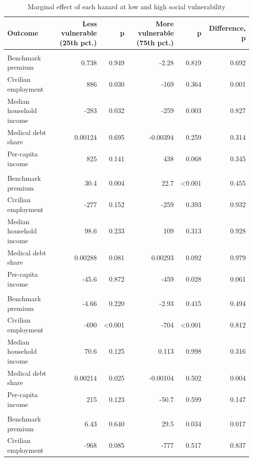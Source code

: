 \begin{table}[htbp]
\centering
\scriptsize
\setlength{\tabcolsep}{4pt}
\sloppy
\caption{Marginal effect of each hazard at low and high social vulnerability}
\label{tab:e3t2}
\begin{tabularx}{\textwidth}{>{\raggedright\arraybackslash}X r r r r r}
\toprule
Outcome & Less vulnerable (25th pct.) & p & More vulnerable (75th pct.) & p  & Difference, p \\
\midrule
\multicolumn{6}{l}{\textit{Extreme heat}} \\
Benchmark premium & 0.738 & 0.949 & -2.28 & 0.819 & 0.692 \\
Civilian employment & 886 & 0.030 & -169 & 0.364 & 0.001 \\
Median household income & -283 & 0.032 & -259 & 0.003 & 0.827 \\
Medical debt share & 0.00124 & 0.695 & -0.00394 & 0.259 & 0.314 \\
Per-capita income & 825 & 0.141 & 438 & 0.068 & 0.345 \\
\addlinespace
\multicolumn{6}{l}{\textit{Extreme cold}} \\
Benchmark premium & 30.4 & 0.004 & 22.7 & \textless{}0.001 & 0.455 \\
Civilian employment & -277 & 0.152 & -259 & 0.393 & 0.932 \\
Median household income & 98.6 & 0.233 & 109 & 0.313 & 0.928 \\
Medical debt share & 0.00288 & 0.081 & 0.00293 & 0.092 & 0.979 \\
Per-capita income & -45.6 & 0.872 & -459 & 0.028 & 0.061 \\
\addlinespace
\multicolumn{6}{l}{\textit{Cumulative cold-years}} \\
Benchmark premium & -4.66 & 0.220 & -2.93 & 0.415 & 0.494 \\
Civilian employment & -690 & \textless{}0.001 & -704 & \textless{}0.001 & 0.812 \\
Median household income & 70.6 & 0.125 & 0.113 & 0.998 & 0.316 \\
Medical debt share & 0.00214 & 0.025 & -0.00104 & 0.502 & 0.004 \\
Per-capita income & 215 & 0.123 & -50.7 & 0.599 & 0.147 \\
\addlinespace
\multicolumn{6}{l}{\textit{Extreme drought}} \\
Benchmark premium & 6.43 & 0.640 & 29.5 & 0.034 & 0.017 \\
Civilian employment & -968 & 0.085 & -777 & 0.517 & 0.837 \\

\end{tabularx}
\end{table}

